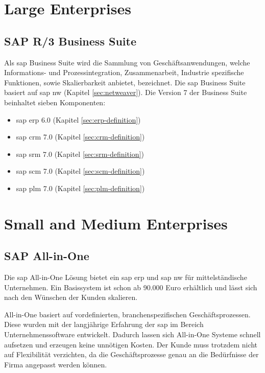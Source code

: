 \section{Large Enterprises}
\subsection{SAP R/3 Business Suite}
\label{sec:business-suite}
Als \gls{sap} Business Suite wird die Sammlung von Geschäftsanwendungen, welche Informations- und Prozessintegration, Zusammenarbeit, Industrie spezifische Funktionen, sowie Skalierbarkeit anbietet, bezeichnet. Die \gls{sap} Business Suite basiert auf \gls{sap} \gls{nw} (Kapitel \ref{sec:netweaver}).
Die Version 7 der Business Suite beinhaltet sieben Komponenten:

\begin{itemize}
	\item \gls{sap} \gls{erp} 6.0 (Kapitel \ref{sec:erp-definition})
	\item \gls{sap} \gls{crm} 7.0 (Kapitel \ref{sec:crm-definition})
	\item \gls{sap} \gls{srm} 7.0 (Kapitel \ref{sec:srm-definition})
	\item \gls{sap} \gls{scm} 7.0 (Kapitel \ref{sec:scm-definition})
	\item \gls{sap} \gls{plm} 7.0 (Kapitel \ref{sec:plm-definition})
\end{itemize}

\cite{SAPNews}

\section{Small and Medium Enterprises}
\subsection{SAP All-in-One}
\label{sec:allinone}

Die \gls{sap} All-in-One Lösung bietet ein \gls{sap} \gls{erp} und \gls{sap} \gls{nw} für mittelständische Unternehmen. Ein Basissystem ist schon ab 90.000 Euro erhältlich und lässt sich nach den Wünschen der Kunden skalieren.

All-in-One basiert auf vordefinierten, branchenspezifischen Geschäftsprozessen. Diese wurden mit der langjährige Erfahrung der \gls{sap} im Bereich Unternehmenssoftware entwickelt. Dadurch lassen sich All-in-One Systeme schnell aufsetzen und erzeugen keine unnötigen Kosten. Der Kunde muss trotzdem nicht auf Flexibilität verzichten, da die Geschäftsprozesse genau an die Bedürfnisse der Firma angepasst werden können.


